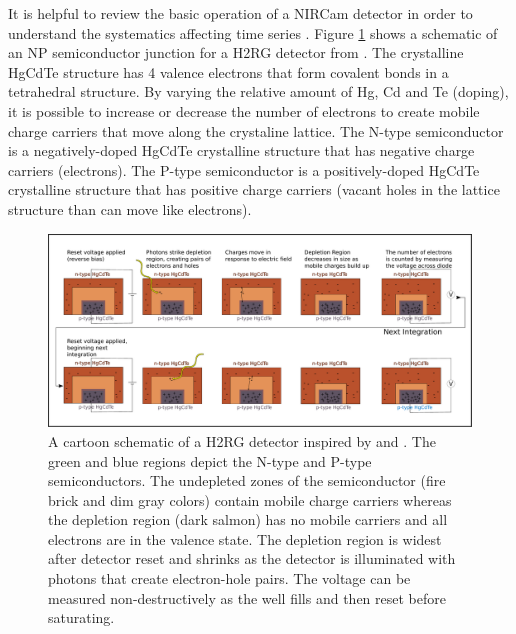 \documentclass{aastex62}
\begin{document}
It is helpful to review the basic operation of a NIRCam detector in order to understand the systematics affecting time series \citep[e.g.][]{rieke2007irDetectorReview}.
Figure \ref{fig:npSchematic} shows a schematic of an NP semiconductor junction for a H2RG detector from \citet{smith2008imgPersistence}.
The crystalline HgCdTe structure has 4 valence electrons that form covalent bonds in a tetrahedral structure.
By varying the relative amount of Hg, Cd and Te (doping), it is possible to increase or decrease the number of electrons to create mobile charge carriers that move along the crystaline lattice.
The N-type semiconductor is a negatively-doped HgCdTe crystalline structure that has negative charge carriers (electrons).
The P-type semiconductor is a positively-doped HgCdTe crystalline structure that has positive charge carriers (vacant holes in the lattice structure than can move like electrons).

\begin{figure}[!hbtp]
\centering
\includegraphics[width=.99\columnwidth]{ideal_photodiode.pdf}
\caption{A cartoon schematic of a H2RG detector inspired by \citet{smith2008imgPersistence} and \citet{tulloch2018persistenceH2RG}.
The green and blue regions depict the N-type and P-type semiconductors.
The undepleted zones of the semiconductor (fire brick and dim gray colors) contain mobile charge carriers whereas the depletion region (dark salmon) has no mobile carriers and all electrons are in the valence state.
The depletion region is widest after detector reset and shrinks as the detector is illuminated with photons that create electron-hole pairs.
The voltage can be measured non-destructively as the well fills and then reset before saturating.}\label{fig:npSchematic}
\end{figure}
\end{document}
